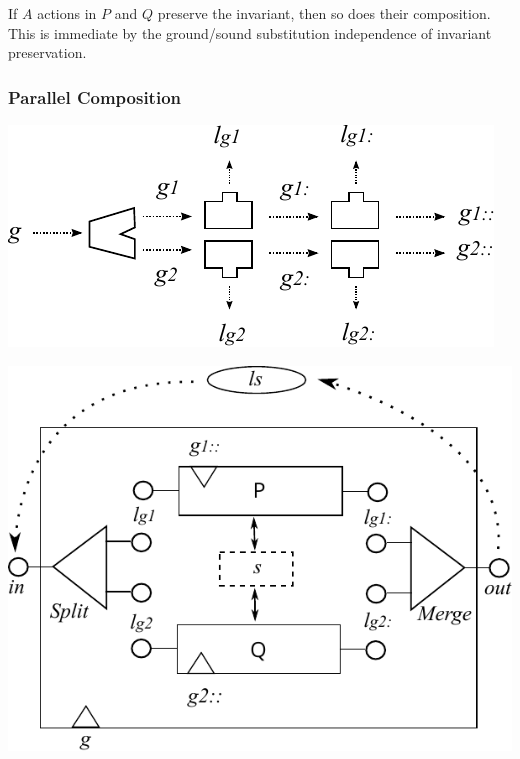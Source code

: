 If $A$ actions in $P$ and $Q$ preserve the invariant,
then so does their composition.
This is immediate by the ground/sound substitution independence
of invariant preservation.



\newpage
\subsubsection{Parallel Composition}


\includegraphics{images/parallel-label-gen}

\includegraphics{images/par-comp-actual}



